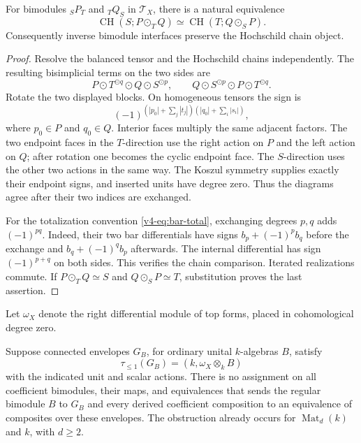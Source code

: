 \begin{lemma}\label{v4-lem:cyclic-two-bar}
For bimodules \({}_SP_T\) and \({}_TQ_S\) in \(\mathcal T_X\),
there is a natural equivalence
\[
 \operatorname{CH}(S;P\odot_T Q)
 \simeq
 \operatorname{CH}(T;Q\odot_S P).
\]
Consequently inverse bimodule interfaces preserve the Hochschild
chain object.
\end{lemma}

\begin{proof}
Resolve the balanced tensor and the Hochschild chains independently.
The resulting bisimplicial terms on the two sides are
\[
 P\odot T^{\odot q}\odot Q\odot S^{\odot p},
 \qquad
 Q\odot S^{\odot p}\odot P\odot T^{\odot q}.
\]
Rotate the two displayed blocks. On homogeneous tensors the sign is
\[
 (-1)^{(|p_0|+\sum_j|t_j|)(|q_0|+\sum_i|s_i|)},
\]
where \(p_0\in P\) and \(q_0\in Q\).
Interior faces multiply the same adjacent factors.
The two endpoint faces in the \(T\)-direction use the right action
on \(P\) and the left action on \(Q\); after rotation one becomes
the cyclic endpoint face. The \(S\)-direction uses the other two
actions in the same way. The Koszul symmetry supplies exactly
their endpoint signs, and inserted units have degree zero.
Thus the diagrams agree after their two indices are exchanged.

For the totalization convention
\eqref{v4-eq:bar-total}, exchanging degrees \(p,q\) adds
\((-1)^{pq}\). Indeed, their two bar differentials have signs
\(b_p+(-1)^p b_q\) before the exchange and
\(b_q+(-1)^q b_p\) afterwards.
The internal differential has sign \((-1)^{p+q}\) on both sides.
This verifies the chain comparison. Iterated realizations commute.
If \(P\odot_T Q\simeq S\) and \(Q\odot_S P\simeq T\),
substitution proves the last assertion.
\end{proof}

Let \(\omega_X\) denote the right differential module of top forms,
placed in cohomological degree zero.

\begin{theorem}\label{v4-thm:connected-Morita-obstruction}
Suppose connected envelopes \(G_B\), for ordinary unital
\(k\)-algebras \(B\), satisfy
\[
 \tau_{\leq1}(G_B)=(k,\omega_X\otimes_k B)
\]
with the indicated unit and scalar actions.
There is no assignment on all coefficient bimodules, their maps,
and equivalences that sends the regular bimodule \(B\) to \(G_B\)
and every derived coefficient composition to an equivalence of
composites over these envelopes.
The obstruction already occurs for \(\operatorname{Mat}_d(k)\)
and \(k\), with \(d\geq2\).
\end{theorem}

